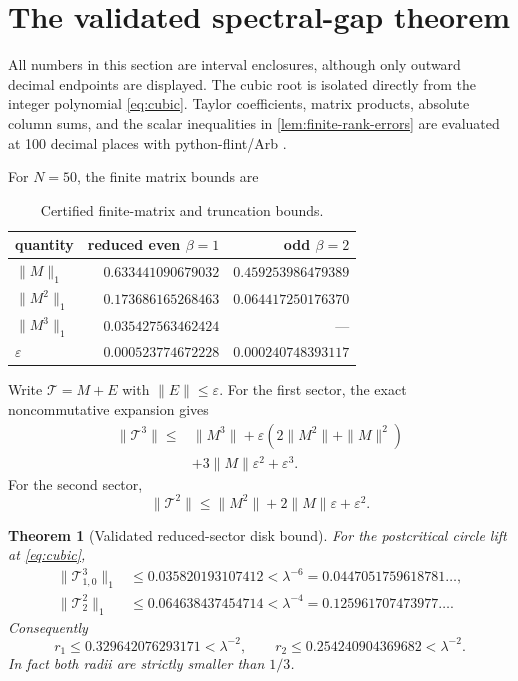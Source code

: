 \documentclass[11pt]{article}
\newtheorem{theorem}{Theorem}[section]
\theoremstyle{definition}
\theoremstyle{remark}
\newcommand{\cT}{\mathcal T}
\begin{document}
\section{The validated spectral-gap theorem}
\label{sec:main-theorem}

All numbers in this section are interval enclosures, although only outward
decimal endpoints are displayed.  The cubic root is isolated directly from
the integer polynomial \eqref{eq:cubic}.  Taylor coefficients, matrix
products, absolute column sums, and the scalar inequalities in
\cref{lem:finite-rank-errors} are evaluated at 100 decimal places with
python-flint/Arb \citep{Johansson2017,PythonFlint2026}.

For $N=50$, the finite matrix bounds are
\begin{table}[H]
\centering
\small
\caption{Certified finite-matrix and truncation bounds.}
\label{tab:certificate}
\begin{tabular}{lrr}
\toprule
quantity & reduced even $\beta=1$ & odd $\beta=2$\\
\midrule
$\|M\|_1$ & $0.633441090679032$ & $0.459253986479389$\\
$\|M^2\|_1$ & $0.173686165268463$ & $0.064417250176370$\\
$\|M^3\|_1$ & $0.035427563462424$ & ---\\
$\varepsilon$ & $0.000523774672228$ & $0.000240748393117$\\
\bottomrule
\end{tabular}
\end{table}

Write $\cT=M+E$ with $\|E\|\le\varepsilon$.  For the first sector, the exact
noncommutative expansion gives
\begin{align}
 \|\cT^3\|
 \le{}&\|M^3\|
 +\varepsilon\left(2\|M^2\|+\|M\|^2\right)\nonumber\\
 &+3\|M\|\varepsilon^2+\varepsilon^3.
 \label{eq:cube-perturbation}
\end{align}
For the second sector,
\begin{equation}\label{eq:square-perturbation}
 \|\cT^2\|
 \le\|M^2\|+2\|M\|\varepsilon+\varepsilon^2.
\end{equation}

\begin{theorem}[Validated reduced-sector disk bound]
\label{thm:validated-gap}
For the postcritical circle lift at \eqref{eq:cubic},
\begin{align}
 \|\cT_{1,0}^3\|_1
 &\le0.035820193107412
 <\lambda^{-6}=0.0447051759618781\ldots,
 \label{eq:certified-one}\\
 \|\cT_2^2\|_1
 &\le0.064638437454714
 <\lambda^{-4}=0.125961707473977\ldots.
 \label{eq:certified-two}
\end{align}
Consequently
\begin{equation}\label{eq:radius-bounds}
 \boxed{
 r_1\le0.329642076293171<\lambda^{-2},
 \qquad
 r_2\le0.254240904369682<\lambda^{-2}.}
\end{equation}
In fact both radii are strictly smaller than $1/3$.
\end{theorem}
\end{document}
